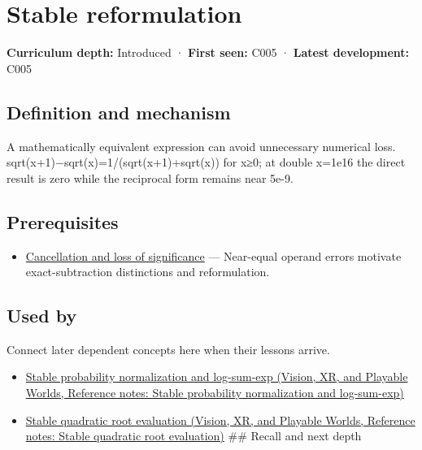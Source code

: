 \hypertarget{appendix-d7f8ba961670}{}\label{referencestart:appendix-d7f8ba961670}
\section{Stable reformulation}\label{appendix-d7f8ba961670-stable-reformulation}

\textbf{Curriculum depth:} Introduced · \textbf{First seen:} C005 · \textbf{Latest development:} C005

\subsection{Definition and mechanism}\label{appendix-d7f8ba961670-definition-and-mechanism}

A mathematically equivalent expression can avoid unnecessary numerical loss. sqrt(x+1)−sqrt(x)=1/(sqrt(x+1)+sqrt(x)) for x≥0; at double x=1e16 the direct result is zero while the reciprocal form remains near 5e-9.

\subsection{Prerequisites}\label{appendix-d7f8ba961670-prerequisites}

\begin{itemize}
\tightlist
\item
  \hyperref[appendix-a2773a6a2f9d]{Cancellation and loss of significance} --- Near-equal operand errors motivate exact-subtraction distinctions and reformulation.
\end{itemize}

\subsection{Used by}\label{appendix-d7f8ba961670-used-by}

Connect later dependent concepts here when their lessons arrive.

\begin{itemize}
\tightlist
\item
  \href{../07-Vision-XR-and-Playable-Worlds/main.pdf\#nameddest=appendix-d580b422240f}{Stable probability normalization and log-sum-exp (Vision, XR, and Playable Worlds, Reference notes: Stable probability normalization and log-sum-exp)}
\item
  \href{../07-Vision-XR-and-Playable-Worlds/main.pdf\#nameddest=appendix-b9afba7f63e5}{Stable quadratic root evaluation (Vision, XR, and Playable Worlds, Reference notes: Stable quadratic root evaluation)} \#\# Recall and next depth
\end{itemize}


